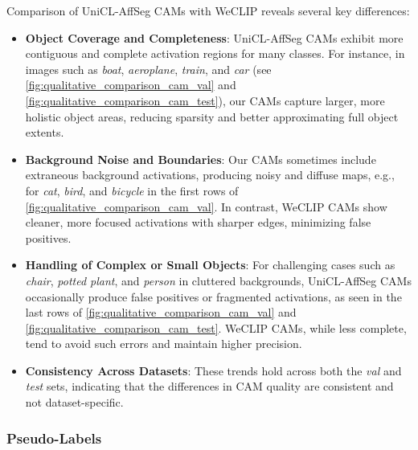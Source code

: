 

Comparison of UniCL-AffSeg CAMs with WeCLIP reveals several key differences:

\begin{itemize}
    \item \textbf{Object Coverage and Completeness}: UniCL-AffSeg CAMs exhibit more contiguous and complete activation regions for many classes. For instance, in images such as \textit{boat}, \textit{aeroplane}, \textit{train}, and \textit{car} (see \autoref{fig:qualitative_comparison_cam_val} and \autoref{fig:qualitative_comparison_cam_test}), our CAMs capture larger, more holistic object areas, reducing sparsity and better approximating full object extents.
    
    \item \textbf{Background Noise and Boundaries}: Our CAMs sometimes include extraneous background activations, producing noisy and diffuse maps, e.g., for \textit{cat}, \textit{bird}, and \textit{bicycle} in the first rows of \autoref{fig:qualitative_comparison_cam_val}. In contrast, WeCLIP CAMs show cleaner, more focused activations with sharper edges, minimizing false positives. 
    
    \item \textbf{Handling of Complex or Small Objects}: For challenging cases such as \textit{chair}, \textit{potted plant}, and \textit{person} in cluttered backgrounds, UniCL-AffSeg CAMs occasionally produce false positives or fragmented activations, as seen in the last rows of \autoref{fig:qualitative_comparison_cam_val} and \autoref{fig:qualitative_comparison_cam_test}. WeCLIP CAMs, while less complete, tend to avoid such errors and maintain higher precision.
    
    \item \textbf{Consistency Across Datasets}: These trends hold across both the \textit{val} and \textit{test} sets, indicating that the differences in CAM quality are consistent and not dataset-specific.
\end{itemize}

\subsubsection{Pseudo-Labels}

